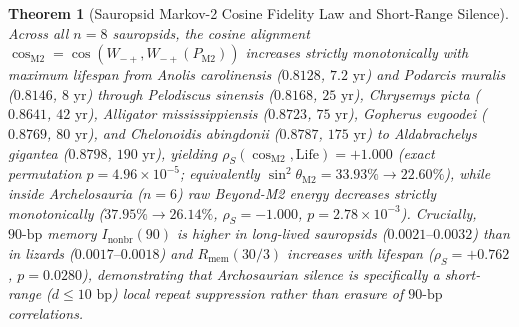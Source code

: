 \documentclass[11pt,a4paper]{article}
\renewcommand{\_}{\origunderscore\penalty200\relax}
\newtheorem{theorem}{Theorem}[section]
\theoremstyle{remark}
\begin{document}
\begin{theorem}[Sauropsid Markov-2 Cosine Fidelity Law and Short-Range Silence]
\label{thm:L8d}
Across all $n=8$ sauropsids, the cosine alignment $\cos_{\mathrm{M2}} = \cos(W_{-+}, W_{-+}(P_{\mathrm{M2}}))$ increases strictly monotonically with maximum lifespan from \textit{Anolis carolinensis} ($0.8128$, $7.2\text{ yr}$) and \textit{Podarcis muralis} ($0.8146$, $8\text{ yr}$) through \textit{Pelodiscus sinensis} ($0.8168$, $25\text{ yr}$), \textit{Chrysemys picta} ($0.8641$, $42\text{ yr}$), \textit{Alligator mississippiensis} ($0.8723$, $75\text{ yr}$), \textit{Gopherus evgoodei} ($0.8769$, $80\text{ yr}$), and \textit{Chelonoidis abingdonii} ($0.8787$, $175\text{ yr}$) to \textit{Aldabrachelys gigantea} ($0.8798$, $190\text{ yr}$), yielding $\rho_S(\cos_{\mathrm{M2}}, \text{Life}) = +1.000$ (exact permutation $p = 4.96 \times 10^{-5}$; equivalently $\sin^2\theta_{\mathrm{M2}} = 33.93\% \to 22.60\%$), while inside Archelosauria ($n=6$) raw Beyond-M2 energy decreases strictly monotonically ($37.95\% \to 26.14\%$, $\rho_S = -1.000$, $p = 2.78 \times 10^{-3}$). Crucially, $90\text{-bp}$ memory $I_{\mathrm{nonbr}}(90)$ is higher in long-lived sauropsids ($0.0021\text{--}0.0032$) than in lizards ($0.0017\text{--}0.0018$) and $R_{\mathrm{mem}}(30/3)$ increases with lifespan ($\rho_S = +0.762$, $p = 0.0280$), demonstrating that Archosaurian silence is specifically a short-range ($d \le 10\text{ bp}$) local repeat suppression rather than erasure of $90\text{-bp}$ correlations.
\end{theorem}
\end{document}
